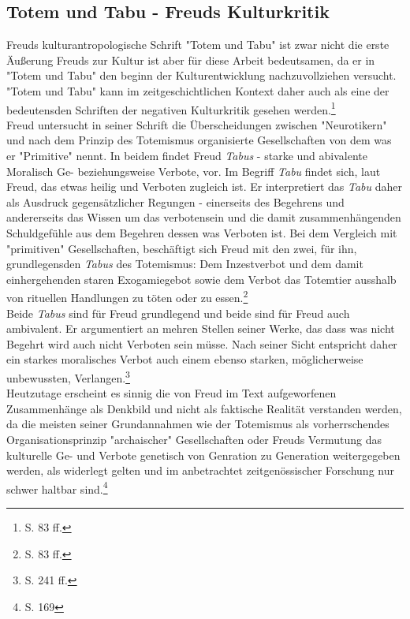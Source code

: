 \documentclass[11pt,a4paper,oneside,numbers=noenddot,bibliography=totocnumbered,DIV=13]{scrartcl}
\begin{document}
\subsection{Totem und Tabu - Freuds Kulturkritik}
Freuds kulturantropologische Schrift "Totem und Tabu" ist zwar nicht die erste Äußerung Freuds zur Kultur ist aber für diese Arbeit bedeutsamen, da er in "Totem und Tabu" den beginn der Kulturentwicklung nachzuvollziehen versucht. "Totem und Tabu" kann im zeitgeschichtlichen Kontext daher auch als eine der bedeutensden Schriften der negativen Kulturkritik gesehen werden.\footnote{\cite{berkel_sigmund_2008} S. 83 ff.} \\
 Freud untersucht in seiner Schrift die Überscheidungen zwischen "Neurotikern" und nach dem Prinzip des Totemismus organisierte Gesellschaften von dem was er "Primitive" nennt. In beidem findet Freud \textit{Tabus} - starke und abivalente Moralisch Ge- beziehungsweise Verbote, vor. Im Begriff \textit{Tabu} findet sich, laut Freud, das etwas heilig und Verboten zugleich ist. Er interpretiert das \textit{Tabu} daher als Ausdruck gegensätzlicher Regungen - einerseits des Begehrens und andererseits das Wissen um das verbotensein und die damit zusammenhängenden Schuldgefühle aus dem Begehren dessen was Verboten ist. Bei dem Vergleich mit "primitiven" Gesellschaften, beschäftigt sich Freud mit den zwei, für ihn, grundlegensden \textit{Tabus} des Totemismus: Dem Inzestverbot und dem damit einhergehenden staren Exogamiegebot sowie dem Verbot das Totemtier ausshalb von rituellen Handlungen zu töten oder zu essen.\footnote{\cite{berkel_sigmund_2008} S. 83 ff.}    \\
 Beide \textit{Tabus} sind für Freud grundlegend und beide sind für Freud auch ambivalent. Er argumentiert an mehren Stellen seiner Werke, das dass was nicht Begehrt wird auch nicht Verboten sein müsse. Nach seiner Sicht entspricht daher ein starkes moralisches Verbot auch einem ebenso starken, möglicherweise unbewussten, Verlangen.\footnote{\cite{lohmann_freud-handbuch:_2013} S. 241 ff.}  \\
Heutzutage erscheint es sinnig  die von Freud im Text aufgeworfenen Zusammenhänge als Denkbild und nicht als faktische Realität verstanden werden, da die meisten seiner Grundannahmen wie der Totemismus als vorherrschendes Organisationsprinzip "archaischer" Gesellschaften oder Freuds Vermutung das  kulturelle Ge- und Verbote genetisch von Genration zu Generation weitergegeben werden, als widerlegt gelten und im anbetrachtet zeitgenössischer Forschung nur schwer haltbar sind.\footnote{\cite{lohmann_freud-handbuch:_2013} S. 169}\\
\end{document}
